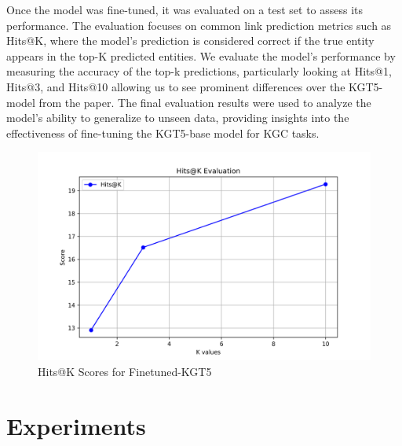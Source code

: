 \documentclass[12pt,a4paper]{article}
\begin{document}
Once the model was fine-tuned, it was evaluated on a test set to assess its performance. The evaluation focuses on common link prediction metrics such as Hits@K, where the model's prediction is considered correct if the true entity appears in the top-K predicted entities. We evaluate the model's performance by measuring the accuracy of the top-k predictions, particularly looking at Hits@1, Hits@3, and Hits@10 allowing us to see prominent differences over the KGT5-model from the paper\cite{yao2023exploring}.
The final evaluation results were used to analyze the model’s ability to generalize to unseen data, providing insights into the effectiveness of fine-tuning the KGT5-base model for KGC tasks.

\begin{figure}
    \centering
    \includegraphics[width=0.5\linewidth]{hits_at_k.png}
    \caption{Hits@K Scores for Finetuned-KGT5}
    \label{fig:kgt5_eval}
\end{figure}


%
%

\section{Experiments}\label{sec:experiments}
\end{document}
